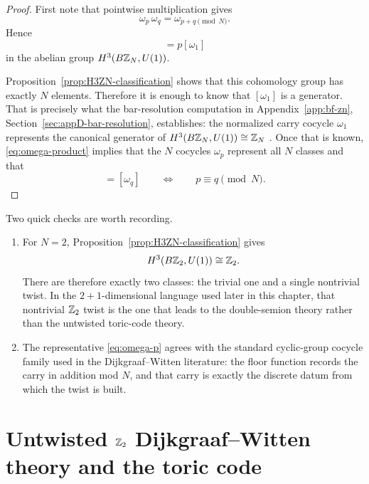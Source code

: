\begin{proof}
First note that pointwise multiplication gives
\begin{equation}\label{eq:omega-product}
\omega_p\,\omega_q=\omega_{p+q\!\!\!\pmod N}.
\end{equation}
Hence
\begin{equation*}
[\omega_p]=p[\omega_1]
\end{equation*}
in the abelian group $H^3(B\mathbb{Z}_N,U(1))$.

\medskip

\noindent Proposition~\ref{prop:H3ZN-classification} shows that this cohomology group has exactly $N$ elements. Therefore it is enough to know that $[\omega_1]$ is a generator. That is precisely what the bar-resolution computation in Appendix~\ref{app:bf-zn}, Section~\ref{sec:appD-bar-resolution}, establishes: the normalized carry cocycle $\omega_1$ represents the canonical generator of $H^3(B\mathbb{Z}_N,U(1))\cong \mathbb{Z}_N$ \cite{DijkgraafWitten1990,Brown1982}. Once that is known, \eqref{eq:omega-product} implies that the $N$ cocycles $\omega_p$ represent all $N$ classes and that
\begin{equation*}
[\omega_p]=[\omega_q]
\qquad\Longleftrightarrow\qquad
p\equiv q \pmod N.
\end{equation*}
\end{proof}

\begin{remark}\label{rem:omega-p-checks}
Two quick checks are worth recording.
\begin{enumerate}
\item For $N=2$, Proposition~\ref{prop:H3ZN-classification} gives
\begin{equation*}
H^3(B\mathbb{Z}_2,U(1))\cong \mathbb{Z}_2.
\end{equation*}
There are therefore exactly two classes: the trivial one and a single nontrivial twist. In the $2+1$-dimensional language used later in this chapter, that nontrivial $\mathbb{Z}_2$ twist is the one that leads to the double-semion theory rather than the untwisted toric-code theory.
\item The representative \eqref{eq:omega-p} agrees with the standard cyclic-group cocycle family used in the Dijkgraaf--Witten literature: the floor function records the carry in addition mod $N$, and that carry is exactly the discrete datum from which the twist is built.
\end{enumerate}
\end{remark}

\section{Untwisted \texorpdfstring{$\mathbb{Z}_2$}{Z\_2} Dijkgraaf--Witten theory and the toric code}\label{sec:dw-toric}

